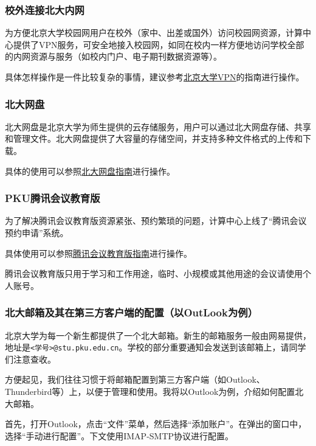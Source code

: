\subsubsection{校外连接北大内网}

为方便北京大学校园网用户在校外（家中、出差或国外）访问校园网资源，计算中心提供了VPN服务，可安全地接入校园网，如同在校内一样方便地访问学校全部的内网资源与服务（如校内门户、电子期刊数据资源等）。

具体怎样操作是一件比较复杂的事情，建议参考\href{https://its.pku.edu.cn/service_1_vpn.jsp}{北京大学VPN}的指南进行操作。

\subsubsection{北大网盘}

北大网盘是北京大学为师生提供的云存储服务，用户可以通过北大网盘存储、共享和管理文件。北大网盘提供了大容量的存储空间，并支持多种文件格式的上传和下载。

具体的使用可以参照\href{https://its.pku.edu.cn/service_1_webdisk.jsp}{北大网盘指南}进行操作。

\subsubsection{PKU腾讯会议教育版}

为了解决腾讯会议教育版资源紧张、预约繁琐的问题，计算中心上线了“腾讯会议预约申请”系统。

具体使用可以参照\href{https://its.pku.edu.cn/service_1_webex.jsp}{腾讯会议教育版指南}进行操作。

\begin{warning}
  腾讯会议教育版只用于学习和工作用途，临时、小规模或其他用途的会议请使用个人账号。
\end{warning}

\subsubsection{北大邮箱及其在第三方客户端的配置（以OutLook为例）}

北京大学为每一个新生都提供了一个北大邮箱。新生的邮箱服务一般由网易提供，地址是\texttt{<学号>@stu.pku.edu.cn}。学校的部分重要通知会发送到该邮箱上，请同学们注意查收。

方便起见，我们往往习惯于将邮箱配置到第三方客户端（如Outlook、Thunderbird等）上，以便于管理和使用。我将以Outlook为例，介绍如何配置北大邮箱。

首先，打开Outlook，点击“文件”菜单，然后选择“添加账户”。在弹出的窗口中，选择“手动进行配置”。下文使用IMAP-SMTP协议进行配置。

